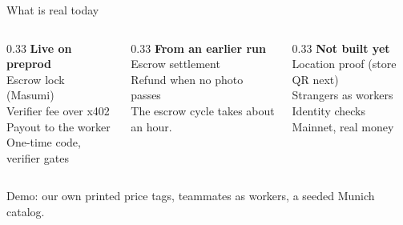 \begin{frame}{What is real today}
  \small
  \begin{columns}[T]
    \begin{column}{0.33\textwidth}
      {\bfseries\color{okgreen} Live on preprod}\\[0.4em]
      Escrow lock (Masumi)\\
      Verifier fee over x402\\
      Payout to the worker\\
      One-time code, verifier gates
    \end{column}
    \begin{column}{0.33\textwidth}
      {\bfseries\color{cardano} From an earlier run}\\[0.4em]
      Escrow settlement\\
      Refund when no photo passes\\[0.4em]
      {\scriptsize The escrow cycle takes about an hour.}
    \end{column}
    \begin{column}{0.33\textwidth}
      {\bfseries\color{nogo} Not built yet}\\[0.4em]
      Location proof (store QR next)\\
      Strangers as workers\\
      Identity checks\\
      Mainnet, real money
    \end{column}
  \end{columns}
  \vspace{1em}
  {\scriptsize Demo: our own printed price tags, teammates as workers, a seeded Munich catalog.}
\end{frame}
